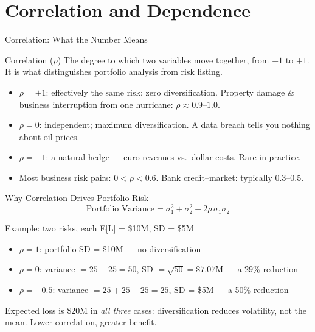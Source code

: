\documentclass[11pt, aspectratio=169]{beamer}
\begin{document}
\section{Correlation and Dependence}

\begin{frame}{Correlation: What the Number Means}
\begin{block}{Correlation ($\rho$)}
The degree to which two variables move together, from $-1$ to $+1$. It is what distinguishes portfolio analysis from risk listing.
\end{block}
\medskip
\begin{itemize}
  \item $\rho = +1$: effectively the same risk; zero diversification. Property damage \& business interruption from one hurricane: $\rho \approx 0.9$--$1.0$.
  \item $\rho = 0$: independent; maximum diversification. A data breach tells you nothing about oil prices.
  \item $\rho = -1$: a natural hedge --- euro revenues vs.\ dollar costs. Rare in practice.
  \item Most business risk pairs: $0 < \rho < 0.6$. Bank credit--market: typically 0.3--0.5.
\end{itemize}
\end{frame}

\begin{frame}{Why Correlation Drives Portfolio Risk}
\[
\text{Portfolio Variance} = \sigma_1^2 + \sigma_2^2 + 2\rho\,\sigma_1\sigma_2
\]
\begin{exampleblock}{Example: two risks, each E[L] = \$10M, SD = \$5M}
\begin{itemize}
  \item $\rho = 1$: portfolio SD = \$10M --- no diversification
  \item $\rho = 0$: variance $= 25 + 25 = 50$, SD $= \sqrt{50} = \$7.07$M --- a 29\% reduction
  \item $\rho = -0.5$: variance $= 25 + 25 - 25 = 25$, SD = \$5M --- a 50\% reduction
\end{itemize}
\end{exampleblock}
\medskip
Expected loss is \$20M in \emph{all three} cases: diversification reduces volatility, not the mean. Lower correlation, greater benefit.
\end{frame}
\end{document}

